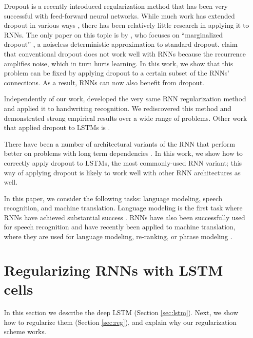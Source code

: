 \documentclass{article} %
\begin{document}
Dropout \cite{srivastava2013improving} is a recently introduced
regularization method that has been very successful with
feed-forward neural networks.   While much work has extended dropout in  
various ways \cite{wang2013fast,wan2013regularization}, there has
been relatively little research in applying it to RNNs. The only
paper on this topic is by \citet{bayer2013fast}, who focuses on
``marginalized dropout'' \cite{wang2013fast}, a
noiseless deterministic approximation to standard dropout.
\citet{bayer2013fast} claim that conventional dropout does not work well
with RNNs because the recurrence amplifies noise, which in turn hurts learning. 
In this work, we show that this problem can be fixed by
applying dropout to a certain subset of the RNNs' connections.  As a result, RNNs
can now also benefit from dropout.


Independently of our work, \cite{pham2013dropout} developed the very same RNN 
regularization method and applied it to handwriting recognition.  We rediscovered
this method and demonstrated strong empirical results over a wide range of problems. 
Other work that applied dropout to LSTMs is \cite{pachitariu2013regularization}.

There have been a number of architectural variants of the RNN that
perform better on problems with long term dependencies
\cite{hochreiter1997long, graves2009novel, cho2014learning,
  jaeger2007optimization, koutnik2014clockwork, sundermeyer2012lstm}.  In this work, we
show how to correctly apply dropout to LSTMs, the most
commonly-used RNN variant; this way of applying dropout is likely to
work well with other RNN architectures as well. 

In this paper, we consider the following tasks: language modeling,
speech recognition, and machine translation.  Language modeling is the
first task where RNNs have achieved substantial success
\cite{mikolov2010recurrent, mikolov2011strategies,
  pascanu2013construct}.  RNNs have also been successfully used for
speech recognition \cite{robinson1996use, graves2013speech} and have
recently been applied to machine translation, where they are 
used for language modeling, re-ranking, or phrase modeling
\cite{devlin14,kal13,cho2014learning,chow1987byblos,mikolov2013exploiting}.


\section{Regularizing RNNs with LSTM cells}

In this section we describe the deep LSTM (Section \ref{sec:lstm}). Next, 
we show how to regularize them (Section \ref{sec:reg}), and explain
why our regularization scheme works.
\end{document}
